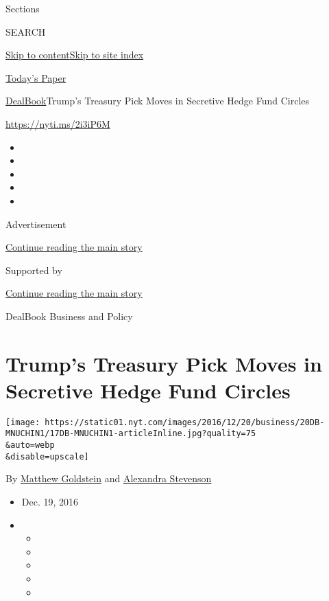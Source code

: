 Sections

SEARCH

\protect\hyperlink{site-content}{Skip to
content}\protect\hyperlink{site-index}{Skip to site index}

\href{https://myaccount.nytimes.com/auth/login?response_type=cookie\&client_id=vi}{}

\href{https://www.nytimes.com/section/todayspaper}{Today's Paper}

\href{/section/business/dealbook}{DealBook}\textbar{}Trump's Treasury
Pick Moves in Secretive Hedge Fund Circles

\url{https://nyti.ms/2i3iP6M}

\begin{itemize}
\item
\item
\item
\item
\item
\end{itemize}

Advertisement

\protect\hyperlink{after-top}{Continue reading the main story}

Supported by

\protect\hyperlink{after-sponsor}{Continue reading the main story}

DealBook Business and Policy

\hypertarget{trumps-treasury-pick-moves-in-secretive-hedge-fund-circles}{%
\section{Trump's Treasury Pick Moves in Secretive Hedge Fund
Circles}\label{trumps-treasury-pick-moves-in-secretive-hedge-fund-circles}}

\texttt{[image: https://static01.nyt.com/images/2016/12/20/business/20DB-MNUCHIN1/17DB-MNUCHIN1-articleInline.jpg?quality=75\\\&auto=webp\\\&disable=upscale]}

By \href{http://www.nytimes.com/by/matthew-goldstein}{Matthew Goldstein}
and \href{http://www.nytimes.com/by/alexandra-stevenson}{Alexandra
Stevenson}

\begin{itemize}
\item
  Dec. 19, 2016
\item
  \begin{itemize}
  \item
  \item
  \item
  \item
  \item
  \end{itemize}
\end{itemize}

